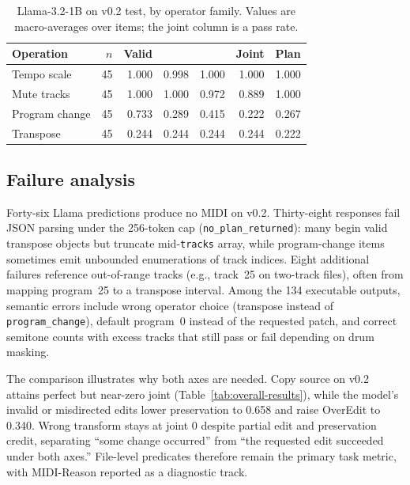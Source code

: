 \begin{table}[t]
\centering
\small
\setlength{\tabcolsep}{4pt}
\begin{tabular}{lrrrrrr}
\toprule
Operation & $n$ & Valid & \edit{} & \preserve{} & Joint & Plan \\
\midrule
Tempo scale & 45 & 1.000 & 0.998 & 1.000 & 1.000 & 1.000 \\
Mute tracks & 45 & 1.000 & 1.000 & 0.972 & 0.889 & 1.000 \\
Program change & 45 & 0.733 & 0.289 & 0.415 & 0.222 & 0.267 \\
Transpose & 45 & 0.244 & 0.244 & 0.244 & 0.244 & 0.222 \\
\bottomrule
\end{tabular}
\caption{Llama-3.2-1B on v0.2 test, by operator family. Values are macro-averages over items; the joint column is a pass rate.}
\label{tab:operator-results}
\end{table}

\subsection{Failure analysis}

Forty-six Llama predictions produce no MIDI on v0.2. Thirty-eight responses fail JSON parsing under the 256-token cap (\texttt{no\_plan\_returned}): many begin valid transpose objects but truncate mid-\texttt{tracks} array, while program-change items sometimes emit unbounded enumerations of track indices. Eight additional failures reference out-of-range tracks (e.g., track~25 on two-track files), often from mapping program~25 to a transpose interval. Among the 134 executable outputs, semantic errors include wrong operator choice (transpose instead of \texttt{program\_change}), default program~0 instead of the requested patch, and correct semitone counts with excess tracks that still pass or fail depending on drum masking.

The comparison illustrates why both axes are needed. Copy source on v0.2 attains perfect \preserve{} but near-zero joint (Table~\ref{tab:overall-results}), while the model's invalid or misdirected edits lower preservation to 0.658 and raise OverEdit to 0.340. Wrong transform stays at joint 0 despite partial edit and preservation credit, separating ``some change occurred'' from ``the requested edit succeeded under both axes.'' File-level predicates therefore remain the primary task metric, with MIDI-Reason reported as a diagnostic track.

